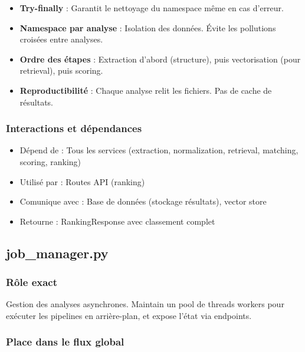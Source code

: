\documentclass[12pt,a4paper,oneside]{book}
\begin{document}
\begin{itemize}
    \item \textbf{Try-finally} : Garantit le nettoyage du namespace même en cas d'erreur.
    
    \item \textbf{Namespace par analyse} : Isolation des données. Évite les pollutions croisées entre analyses.
    
    \item \textbf{Ordre des étapes} : Extraction d'abord (structure), puis vectorisation (pour retrieval), puis scoring.
    
    \item \textbf{Reproductibilité} : Chaque analyse relit les fichiers. Pas de cache de résultats.
\end{itemize}

\subsubsection{Interactions et dépendances}

\begin{itemize}
    \item Dépend de : Tous les services (extraction, normalization, retrieval, matching, scoring, ranking)
    \item Utilisé par : Routes API (ranking)
    \item Comunique avec : Base de données (stockage résultats), vector store
    \item Retourne : RankingResponse avec classement complet
\end{itemize}

\subsection{job\_manager.py}

\subsubsection{Rôle exact}

Gestion des analyses asynchrones. Maintain un pool de threads workers pour exécuter les pipelines en arrière-plan, et expose l'état via endpoints.

\subsubsection{Place dans le flux global}
\end{document}
